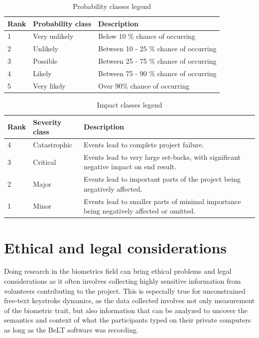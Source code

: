 \documentclass[informationsecurity]{gucmasterproject}
\begin{document}
\begin{table}[H]
\centering
\caption{Probability classes legend}
\label{tab:probability-classes}
\begin{tabular}{ p{2cm} p{3cm} p{8cm}}
\hline \bf Rank & \bf Probability class & \bf Description \\
\hline 1 & Very unlikely & Below 10 \% chance of occurring \\
2 & Unlikely & Between 10 - 25 \% chance of occurring \\
3 & Possible & Between 25 - 75 \% chance of occurring \\
4 & Likely & Between 75 - 90 \% chance of occurring \\
5 & Very likely & Over 90\% chance of occurring \\

\hline

\end{tabular}
\end{table}

\begin{table}[H]
\centering
\caption{Impact classes legend}
\label{tab:impact-classes}
\begin{tabular}{ p{2cm} p{3cm} p{8cm}}
\hline \bf Rank & \bf Severity class & \bf Description \\

\hline 4 & Catastrophic & Events lead to complete project failure. \\
3 & Critical & Events lead to very large set-backs, with significant negative impact on end result.\\
2 & Major & Events lead to important parts of the project being negatively affected. \\
1 & Minor & Events lead to smaller parts of minimal importance being negatively affected or omitted.\\
\hline
\end{tabular}
\end{table}





\chapter{Ethical and legal considerations}
Doing research in the biometrics field can bring ethical problems and legal considerations as it often involves collecting highly sensitive information from volunteers contributing to the project.
This is especially true for unconstrained free-text keystroke dynamics, as the data collected involves not only measurement of the biometric trait, but also information that can be analyzed to uncover the semantics and context of what the participants typed on their private computers as long as the BeLT software was recording.
\end{document}
